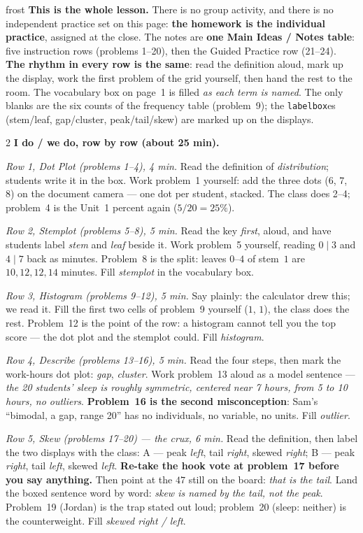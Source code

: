 \documentclass[10pt]{article}
\begin{document}
\boxguard
\begin{skillbox}{frost}
\textbf{This is the whole lesson.} There is no group activity, and there is no independent
practice set on this page: \textbf{the homework is the individual practice}, assigned at the
close. The notes are \textbf{one Main Ideas / Notes table}: five instruction rows (problems
1--20), then the Guided Practice row (21--24). \textbf{The rhythm in every row is the same}:
read the definition aloud, mark up the display, work the first problem of the grid yourself,
then hand the rest to the room. The vocabulary box on page~1 is filled \emph{as each term is
named}. The only blanks are the six counts of the frequency table (problem~9); the
\texttt{labelbox}es (stem/leaf, gap/cluster, peak/tail/skew) are marked up on the displays.
\begin{multicols}{2}
\textbf{I do / we do, row by row (about 25 min).}

\emph{Row 1, Dot Plot (problems 1--4), 4 min.} Read the definition of \emph{distribution};
students write it in the box. Work problem~1 yourself: add the three dots (6, 7, 8) on the
document camera --- one dot per student, stacked. The class does 2--4; problem~4 is the Unit~1
percent again ($5/20 = 25\%$).

\emph{Row 2, Stemplot (problems 5--8), 5 min.} Read the key \emph{first}, aloud, and have
students label \emph{stem} and \emph{leaf} beside it. Work problem~5 yourself, reading $0\mid3$
and $4\mid7$ back as minutes. Problem~8 is the split: leaves $0$--$4$ of stem~$1$ are
$10, 12, 12, 14$ minutes. Fill \emph{stemplot} in the vocabulary box.

\emph{Row 3, Histogram (problems 9--12), 5 min.} Say plainly: the calculator drew this; we read
it. Fill the first two cells of problem~9 yourself ($1$, $1$), the class does the rest. Problem~12
is the point of the row: a histogram cannot tell you the top score --- the dot plot and the
stemplot could. Fill \emph{histogram}.

\emph{Row 4, Describe (problems 13--16), 5 min.} Read the four steps, then mark the work-hours
dot plot: \emph{gap}, \emph{cluster}. Work problem~13 aloud as a model sentence --- \emph{the
20 students' sleep is roughly symmetric, centered near 7 hours, from 5 to 10 hours, no
outliers}. \textbf{Problem~16 is the second misconception}: Sam's ``bimodal, a gap, range 20''
has no individuals, no variable, no units. Fill \emph{outlier}.

\emph{Row 5, Skew (problems 17--20) --- the crux, 6 min.} Read the definition, then label the
two displays with the class: A --- peak \emph{left}, tail \emph{right}, skewed \emph{right};
B --- peak \emph{right}, tail \emph{left}, skewed \emph{left}. \textbf{Re-take the hook vote at
problem~17 before you say anything.} Then point at the $47$ still on the board: \emph{that is
the tail}. Land the boxed sentence word by word: \emph{skew is named by the tail, not the peak}.
Problem~19 (Jordan) is the trap stated out loud; problem~20 (sleep: neither) is the
counterweight. Fill \emph{skewed right / left}.


\end{multicols}
\end{skillbox}
\end{document}
